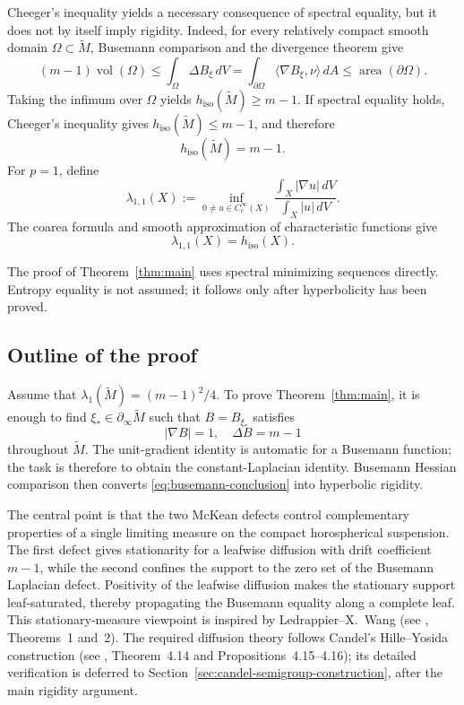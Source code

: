 \documentclass[12pt]{amsart}
\theoremstyle{definition}
\numberwithin{equation}{section}
\newcommand{\wti}{\widetilde}
\newcommand{\vol}{\operatorname{vol}}
\newcommand{\area}{\operatorname{area}}
\begin{document}
Cheeger's inequality yields a necessary consequence of spectral equality,
but it does not by itself imply rigidity.  Indeed, for every relatively
compact smooth domain \(\Omega\subset\wti M\), Busemann comparison and the
divergence theorem give
\[
  (m-1)\vol(\Omega)
  \leq\int_\Omega\Delta B_\xi\,dV
  =\int_{\partial\Omega}\langle\nabla B_\xi,\nu\rangle\,dA
  \leq\area(\partial\Omega).
\]
Taking the infimum over \(\Omega\) yields
\(h_{\mathrm{iso}}(\wti M)\geq m-1\).  If spectral equality holds, Cheeger's
inequality gives \(h_{\mathrm{iso}}(\wti M)\leq m-1\), and therefore
\[
  h_{\mathrm{iso}}(\wti M)=m-1.
\]
For \(p=1\), define
\[
  \lambda_{1,1}(X)
  :=
  \inf_{0\neq u\in C_c^\infty(X)}
  \frac{\int_X|\nabla u|\,dV}
       {\int_X|u|\,dV}.
\]
The coarea formula and smooth approximation of characteristic functions
give
\[
  \lambda_{1,1}(X)=h_{\mathrm{iso}}(X).
\]


The proof of Theorem~\ref{thm:main} uses spectral minimizing sequences
directly.  Entropy equality is not assumed; it follows only after
hyperbolicity has been proved.

\subsection*{Outline of the proof}

Assume that \(\lambda_1(\wti M)=(m-1)^2/4\).  To prove
Theorem~\ref{thm:main}, it is enough to find
\(\xi_*\in\partial_\infty\wti M\) such that \(B=B_{\xi_*}\) satisfies
\begin{equation}\label{eq:busemann-conclusion}
  |\nabla B|=1,
  \quad
  \Delta B=m-1
\end{equation}
throughout \(\wti M\).  The unit-gradient identity is automatic for a
Busemann function; the task is therefore to obtain the constant-Laplacian
identity.  Busemann Hessian comparison then converts
\eqref{eq:busemann-conclusion} into hyperbolic rigidity.

The central point is that the two McKean defects control complementary
properties of a single limiting measure on the compact horospherical
suspension.  The first defect gives stationarity for a leafwise diffusion
with drift coefficient \(m-1\), while the second confines the support to
the zero set of the Busemann Laplacian defect.  Positivity of the leafwise
diffusion makes the stationary support leaf-saturated, thereby propagating
the Busemann equality along a complete leaf.  This stationary-measure
viewpoint is inspired by Ledrappier--X.~Wang
(see \cite{LedrappierWang2010}, Theorems~1 and~2).  The required diffusion
theory follows Candel's Hille--Yosida construction
(see \cite{Candel2003}, Theorem~4.14 and
Propositions~4.15--4.16); its detailed verification is deferred to
Section~\ref{sec:candel-semigroup-construction}, after the main rigidity
argument.
\end{document}
